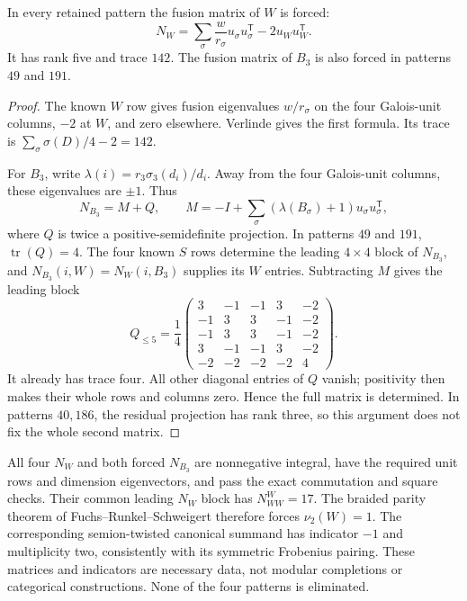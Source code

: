 \begin{proposition}
In every retained pattern the fusion matrix of $W$ is forced:
\[
 N_W=\sum_\sigma\frac{w}{r_\sigma}u_\sigma u_\sigma^{\mathsf T}
                  -2u_Wu_W^{\mathsf T}.
\]
It has rank five and trace $142$. The fusion matrix of $B_3$ is also
forced in patterns $49$ and $191$.
\end{proposition}
\begin{proof}
The known $W$ row gives fusion eigenvalues $w/r_\sigma$ on the four
Galois-unit columns, $-2$ at $W$, and zero elsewhere. Verlinde gives the
first formula. Its trace is
$\sum_\sigma\sigma(D)/4-2=142$.

For $B_3$, write
$\lambda(i)=r_3\sigma_3(d_i)/d_i$. Away from the four Galois-unit columns,
these eigenvalues are $\pm1$. Thus
\[
 N_{B_3}=M+Q,\qquad
 M=-I+\sum_\sigma(\lambda(B_\sigma)+1)
                       u_\sigma u_\sigma^{\mathsf T},
\]
where $Q$ is twice a positive-semidefinite projection. In patterns $49$
and $191$, $\operatorname{tr}(Q)=4$. The four known $S$ rows determine
the leading $4\times4$ block of $N_{B_3}$, and
$N_{B_3}(i,W)=N_W(i,B_3)$ supplies its $W$ entries. Subtracting $M$
gives the leading block
\[
 Q_{\le5}=\frac14
 \begin{pmatrix}
 3&-1&-1&3&-2\\-1&3&3&-1&-2\\-1&3&3&-1&-2\\
 3&-1&-1&3&-2\\-2&-2&-2&-2&4
 \end{pmatrix}.
\]
It already has trace four. All other diagonal entries of $Q$ vanish;
positivity then makes their whole rows and columns zero. Hence the full
matrix is determined. In patterns $40,186$, the residual projection has
rank three, so this argument does not fix the whole second matrix.
\end{proof}

All four $N_W$ and both forced $N_{B_3}$ are nonnegative integral,
have the required unit rows and dimension eigenvectors, and pass the
exact commutation and square checks. Their common leading $N_W$ block
has $N_{WW}^{W}=17$. The braided parity theorem of
Fuchs--Runkel--Schweigert \cite{FRSEven} therefore forces
$\nu_2(W)=1$. The corresponding semion-twisted canonical summand has
indicator $-1$ and multiplicity two, consistently with its symmetric
Frobenius pairing. These matrices and indicators are necessary data,
not modular completions or categorical constructions. None of the four
patterns is eliminated.

